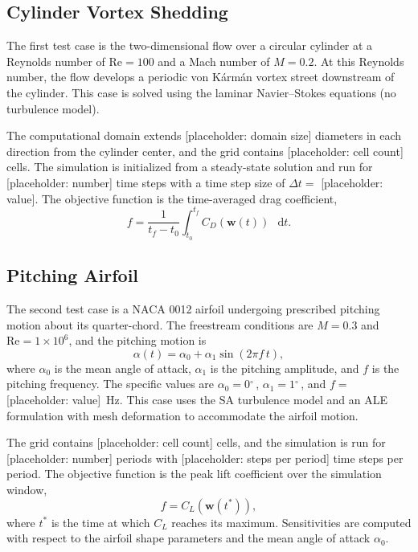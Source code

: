 \documentclass[journal]{new-aiaa}
\newcommand{\degree}{\ensuremath{^\circ\,}}
\newcommand{\f}[2]{\frac{#1}{#2}}
\newcommand{\mb}[1]{\mathbf{#1}}
\renewcommand{\d}{\mathop{}\!\mathrm{d}} %
\begin{document}
\subsection{Cylinder Vortex Shedding}\label{sec:cylinder}
The first test case is the two-dimensional flow over a circular cylinder at a Reynolds number of $\text{Re} = 100$ and a Mach number of $M = 0.2$.
At this Reynolds number, the flow develops a periodic von K\'arm\'an vortex street downstream of the cylinder.
This case is solved using the laminar Navier--Stokes equations (no turbulence model).

The computational domain extends [placeholder: domain size] diameters in each direction from the cylinder center, and the grid contains [placeholder: cell count] cells.
The simulation is initialized from a steady-state solution and run for [placeholder: number] time steps with a time step size of $\Delta t = $ [placeholder: value].
The objective function is the time-averaged drag coefficient,
\begin{equation}\label{eq:cylinder_obj}
f = \f{1}{t_f - t_0} \int_{t_0}^{t_f} C_D(\mb{w}(t)) \, \d t.
\end{equation}


\subsection{Pitching Airfoil}\label{sec:pitching}
The second test case is a NACA 0012 airfoil undergoing prescribed pitching motion about its quarter-chord.
The freestream conditions are $M = 0.3$ and $\text{Re} = 1 \times 10^6$, and the pitching motion is
\begin{equation}\label{eq:pitch_motion}
\alpha(t) = \alpha_0 + \alpha_1 \sin(2 \pi f \, t),
\end{equation}
where $\alpha_0$ is the mean angle of attack, $\alpha_1$ is the pitching amplitude, and $f$ is the pitching frequency.
The specific values are $\alpha_0 = 0\degree$, $\alpha_1 = 1\degree$, and $f =$ [placeholder: value]~Hz.
This case uses the SA turbulence model and an ALE formulation with mesh deformation to accommodate the airfoil motion.

The grid contains [placeholder: cell count] cells, and the simulation is run for [placeholder: number] periods with [placeholder: steps per period] time steps per period.
The objective function is the peak lift coefficient over the simulation window,
\begin{equation}\label{eq:pitch_obj}
f = C_L(\mb{w}(t^*)),
\end{equation}
where $t^*$ is the time at which $C_L$ reaches its maximum.
Sensitivities are computed with respect to the airfoil shape parameters and the mean angle of attack $\alpha_0$.
\end{document}
